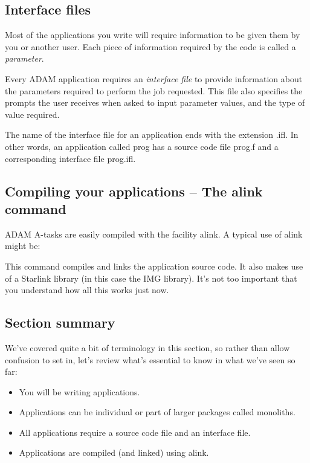 \documentclass[11pt,nolof]{starlink}
\begin{document}
\subsection{Interface files}

       Most of the applications you write will require information to
       be given them by you or another user. Each piece of information
       required by the code is called a \textit{parameter}.

       Every ADAM application requires an \textit{interface file} to provide
       information about the parameters required to
       perform the job requested. This file also specifies the
       prompts the user receives when asked to input parameter values,
       and the type of value required.

       The name of the interface file for an application ends with the
       extension \textsf{.ifl}. In other words, an application called \textsf{prog}
       has a source code file \textsf{prog.f} and a corresponding interface file
       \textsf{prog.ifl}.

\subsection{Compiling your applications -- The alink command}

ADAM A-tasks are easily compiled with the facility \textsf{alink}.
A typical use of \textsf{alink} might be:

\begin{terminalv}
\end{terminalv}

This command compiles and links the application source code. It
also makes use of a Starlink library (in this case the IMG library).
It's not too important that you understand how all this works just
now.

\subsection{Section summary}

We've covered quite a bit of terminology in this section, so rather than
allow confusion to set in, let's review what's essential to know in
what we've seen so far:

\begin{itemize}
\item You will be writing applications.
\item Applications can be individual or part of larger packages
called monoliths.
\item All applications require a source code file and an interface file.
\item Applications are compiled (and linked) using \textsf{alink}.
\end{itemize}
\end{document}
